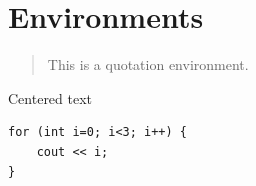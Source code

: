 \documentclass{article}
\begin{document}
\section{Environments}
\begin{quote}
This is a quotation environment.
\end{quote}
\begin{center}
Centered text
\end{center}
\begin{verbatim}
for (int i=0; i<3; i++) {
    cout << i;
}
\end{verbatim}
\end{document}
